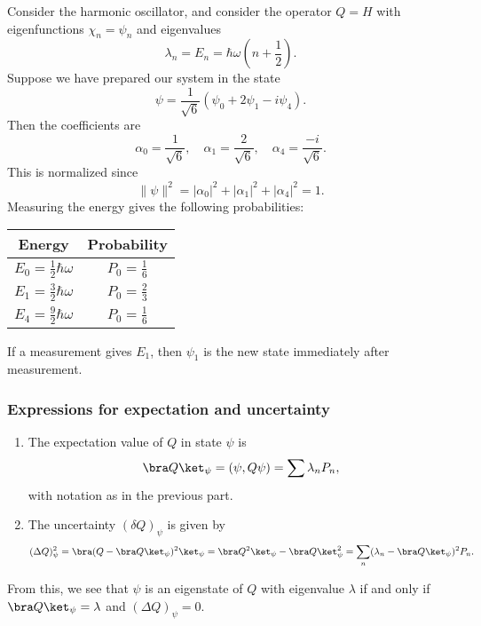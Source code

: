 \documentclass[a4paper]{article}
\begin{document}
\begin{eg}
  Consider the harmonic oscillator, and consider the operator $Q = H$ with eigenfunctions $\chi_n = \psi_n$ and eigenvalues
  \[
    \lambda_n = E_n = \hbar \omega \left(n + \frac{1}{2}\right).
  \]
  Suppose we have prepared our system in the state
  \[
    \psi = \frac{1}{\sqrt{6}}(\psi_0 + 2\psi_1 - i \psi_4).
  \]
  Then the coefficients are
  \[
    \alpha_0 = \frac{1}{\sqrt{6}},\quad \alpha_1 = \frac{2}{\sqrt{6}},\quad \alpha_4 = \frac{-i}{\sqrt{6}}.
  \]
  This is normalized since
  \[
    \|\psi\|^2 = |\alpha_0|^2 + |\alpha_1|^2 + |\alpha_4|^2 = 1.
  \]
  Measuring the energy gives the following probabilities:
  \begin{center}
    \begin{tabular}{cc}
      \toprule
      \textbf{Energy} & \textbf{Probability}\\
      \midrule
      $\displaystyle E_0 = \frac{1}{2} \hbar \omega$ & $\displaystyle P_0 = \frac{1}{6}$\\\addlinespace
      $\displaystyle E_1 = \frac{3}{2} \hbar \omega$ & $\displaystyle P_0 = \frac{2}{3}$\\\addlinespace
      $\displaystyle E_4 = \frac{9}{2} \hbar \omega$ & $\displaystyle P_0 = \frac{1}{6}$\\
      \bottomrule
    \end{tabular}
  \end{center}
  If a measurement gives $E_1$, then $\psi_1$ is the new state immediately after measurement.
\end{eg}

\subsubsection*{Expressions for expectation and uncertainty}
\begin{prop}\leavevmode
  \begin{enumerate}
    \item The expectation value of $Q$ in state $\psi$ is
      \[
        \bra Q\ket_\psi = (\psi, Q\psi) = \sum \lambda_n P_n,
      \]
      with notation as in the previous part.
    \item The uncertainty $(\delta Q)_\psi$ is given by
      \[
        (\Delta Q)^2_\psi = \bra (Q - \bra Q\ket_\psi)^2\ket_\psi = \bra Q^2\ket_\psi - \bra Q\ket_\psi^2 = \sum_n (\lambda_n - \bra Q\ket_\psi)^2 P_n.
      \]
  \end{enumerate}
\end{prop}
From this, we see that $\psi$ is an eigenstate of $Q$ with eigenvalue $\lambda$ if and only if $\bra Q\ket_\psi = \lambda$ and $(\Delta Q)_\psi = 0$.
\end{document}
